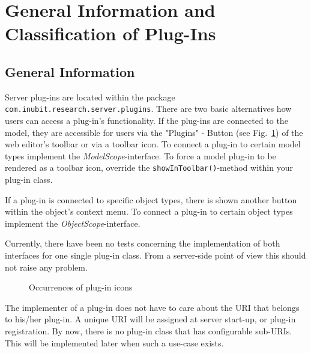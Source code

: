 \section{General Information and Classification of Plug-Ins}
\subsection{General Information}

Server plug-ins are located within the package
\verb!com.inubit.research.server.plugins!. 
There are two basic alternatives how users can access a plug-in's
functionality. 
If the plug-ins are connected to the model, they are accessible
for users via the "Plugins" - Button (see Fig.~\ref{screenshot}) of the web
editor's toolbar or via a toolbar icon. To connect a plug-in to certain model
types implement the \textit{ModelScope}-interface. To force a model plug-in to
be
rendered as a toolbar icon, override the \verb!showInToolbar()!-method within
your plug-in class.

If a plug-in is connected to specific object types, there is shown another
button within the object's context menu. To connect a plug-in to certain object
types implement the \textit{ObjectScope}-interface.

Currently, there have been no tests concerning the implementation of
both interfaces for one single plug-in class. From a server-side point of view
this should not raise any problem.

\begin{figure}[ht]
	\begin{center}
	\qquad
	\end{center}
	\caption{Occurrences of plug-in icons}
	\label{screenshot}
\end{figure}

The implementer of a plug-in does not have to care about the URI that belongs
to his/her plug-in. A unique URI will be assigned at server start-up, or plug-in
registration. By now, there is no plug-in class that has configurable sub-URIs.
This will be implemented later when such a use-case exists.

